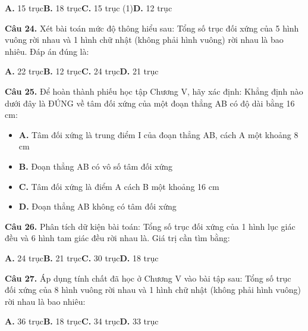 \documentclass[11pt,a4paper]{article}
\begin{document}
\hspace*{1.5em}\textbf{A.} 15 trục\quad\quad \textbf{B.} 18 trục\quad\quad \textbf{C.} 15 trục (1)\quad\quad \textbf{D.} 12 trục\par\vspace{2pt}
\textbf{\color{primary} Câu 24.} Xét bài toán mức độ thông hiểu sau: Tổng số trục đối xứng của 5 hình vuông rời nhau và 1 hình chữ nhật (không phải hình vuông) rời nhau là bao nhiêu. Đáp án đúng là:\par
\hspace*{1.5em}\textbf{A.} 22 trục\quad\quad \textbf{B.} 12 trục\quad\quad \textbf{C.} 24 trục\quad\quad \textbf{D.} 21 trục\par\vspace{2pt}
\textbf{\color{primary} Câu 25.} Để hoàn thành phiếu học tập Chương V, hãy xác định: Khẳng định nào dưới đây là ĐÚNG về tâm đối xứng của một đoạn thẳng AB có độ dài bằng 16 cm:\par
\begin{itemize}\setlength{\itemsep}{1pt}\setlength{\parskip}{0pt}
  \item[] \textbf{A.} Tâm đối xứng là trung điểm I của đoạn thẳng AB, cách A một khoảng 8 cm
  \item[] \textbf{B.} Đoạn thẳng AB có vô số tâm đối xứng
  \item[] \textbf{C.} Tâm đối xứng là điểm A cách B một khoảng 16 cm
  \item[] \textbf{D.} Đoạn thẳng AB không có tâm đối xứng
\end{itemize}\vspace{2pt}
\textbf{\color{primary} Câu 26.} Phân tích dữ kiện bài toán: Tổng số trục đối xứng của 1 hình lục giác đều và 6 hình tam giác đều rời nhau là. Giá trị cần tìm bằng:\par
\hspace*{1.5em}\textbf{A.} 24 trục\quad\quad \textbf{B.} 21 trục\quad\quad \textbf{C.} 30 trục\quad\quad \textbf{D.} 18 trục\par\vspace{2pt}
\textbf{\color{primary} Câu 27.} Áp dụng tính chất đã học ở Chương V vào bài tập sau: Tổng số trục đối xứng của 8 hình vuông rời nhau và 1 hình chữ nhật (không phải hình vuông) rời nhau là bao nhiêu:\par
\hspace*{1.5em}\textbf{A.} 36 trục\quad\quad \textbf{B.} 18 trục\quad\quad \textbf{C.} 34 trục\quad\quad \textbf{D.} 33 trục\par\vspace{2pt}
\end{document}
